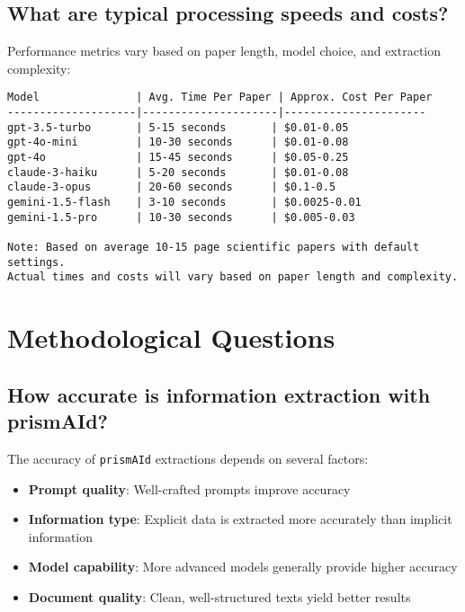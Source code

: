 \subsection{What are typical processing speeds and costs?}

Performance metrics vary based on paper length, model choice, and extraction complexity:

\begin{commandbox}
\begin{lstlisting}
Model               | Avg. Time Per Paper | Approx. Cost Per Paper
--------------------|---------------------|----------------------
gpt-3.5-turbo       | 5-15 seconds       | $0.01-0.05
gpt-4o-mini         | 10-30 seconds      | $0.01-0.08
gpt-4o              | 15-45 seconds      | $0.05-0.25
claude-3-haiku      | 5-20 seconds       | $0.01-0.08
claude-3-opus       | 20-60 seconds      | $0.1-0.5
gemini-1.5-flash    | 3-10 seconds       | $0.0025-0.01
gemini-1.5-pro      | 10-30 seconds      | $0.005-0.03

Note: Based on average 10-15 page scientific papers with default settings.
Actual times and costs will vary based on paper length and complexity.
\end{lstlisting}
\end{commandbox}

\section{Methodological Questions}

\subsection{How accurate is information extraction with prismAId?}

The accuracy of \texttt{prismAId} extractions depends on several factors:

\begin{itemize}
    \item \textbf{Prompt quality}: Well-crafted prompts improve accuracy
    \item \textbf{Information type}: Explicit data is extracted more accurately than implicit information
    \item \textbf{Model capability}: More advanced models generally provide higher accuracy
    \item \textbf{Document quality}: Clean, well-structured texts yield better results
\end{itemize}

